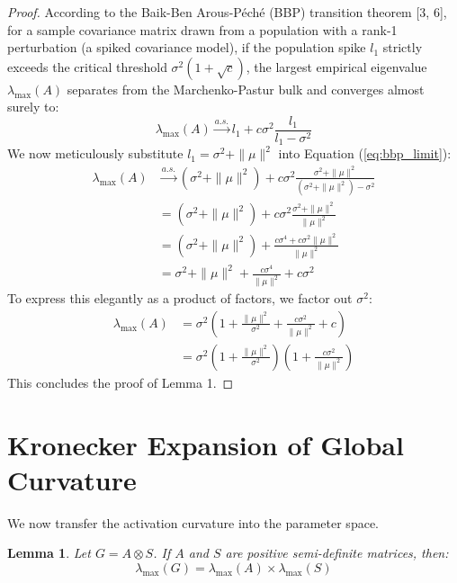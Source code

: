 \documentclass[11pt, a4paper]{article}
\newtheorem{lemma}{Lemma}
\begin{document}
\begin{proof}
According to the Baik-Ben Arous-P\'ech\'e (BBP) transition theorem [3, 6], for a sample covariance matrix drawn from a population with a rank-1 perturbation (a spiked covariance model), if the population spike $l_1$ strictly exceeds the critical threshold $\sigma^2(1 + \sqrt{c})$, the largest empirical eigenvalue $\lambda_{\max}(A)$ separates from the Marchenko-Pastur bulk and converges almost surely to:
\begin{equation}
    \lambda_{\max}(A) \xrightarrow{a.s.} l_1 + c \sigma^2 \frac{l_1}{l_1 - \sigma^2} \label{eq:bbp_limit}
\end{equation}
We now meticulously substitute $l_1 = \sigma^2 + \|\mu\|^2$ into Equation (\ref{eq:bbp_limit}):
\begin{align}
    \lambda_{\max}(A) &\xrightarrow{a.s.} (\sigma^2 + \|\mu\|^2) + c \sigma^2 \frac{\sigma^2 + \|\mu\|^2}{(\sigma^2 + \|\mu\|^2) - \sigma^2} \\
    &= (\sigma^2 + \|\mu\|^2) + c \sigma^2 \frac{\sigma^2 + \|\mu\|^2}{\|\mu\|^2} \\
    &= (\sigma^2 + \|\mu\|^2) + \frac{c \sigma^4 + c \sigma^2 \|\mu\|^2}{\|\mu\|^2} \\
    &= \sigma^2 + \|\mu\|^2 + \frac{c \sigma^4}{\|\mu\|^2} + c \sigma^2 \label{eq:expanded_lambda}
\end{align}
To express this elegantly as a product of factors, we factor out $\sigma^2$:
\begin{align}
    \lambda_{\max}(A) &= \sigma^2 \left( 1 + \frac{\|\mu\|^2}{\sigma^2} + \frac{c \sigma^2}{\|\mu\|^2} + c \right) \\
    &= \sigma^2 \left( 1 + \frac{\|\mu\|^2}{\sigma^2} \right) \left( 1 + \frac{c \sigma^2}{\|\mu\|^2} \right)
\end{align}
This concludes the proof of Lemma 1.
\end{proof}

\section{Kronecker Expansion of Global Curvature}

We now transfer the activation curvature into the parameter space.

\begin{lemma} \label{lemma:kronecker}
Let $G = A \otimes S$. If $A$ and $S$ are positive semi-definite matrices, then:
\begin{equation}
    \lambda_{\max}(G) = \lambda_{\max}(A) \times \lambda_{\max}(S)
\end{equation}
\end{lemma}
\end{document}

